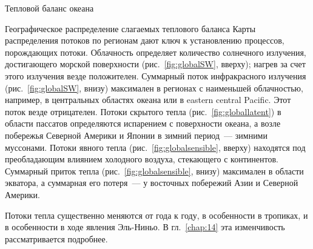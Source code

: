 \begin{chapter}{Тепловой баланс океана}
\begin{section}{Географическое распределение слагаемых теплового баланса}
Карты распределения потоков по регионам дают ключ к установлению процессов,
порождающих потоки. Облачность определяет количество солнечного излучения,
достигающего морской поверхности (рис.~\ref{fig:globalSW}, вверху); 
нагрев за счет этого излучения везде положителен. 
Суммарный поток инфракрасного излучения (рис.~\ref{fig:globalSW}, внизу)
максимален в регионах с наименьшей облачностью, например, в центральных 
областях океана или в eastern central Pacific. Этот поток везде отрицателен.
Потоки скрытого тепла (рис.~\ref{fig:globallatent}) в области пассатов определяются испарением
с поверхности океана, а возле побережья Северной Америки и Японии в зимний
период~--- зимними муссонами. 
Потоки явного тепла (рис.~\ref{fig:globalsensible}, вверху) 
находятся под преобладающим влиянием холодного воздуха, стекающего 
с континентов. 
Суммарный приток тепла (рис.~\ref{fig:globalsensible}, внизу) 
максимален в области экватора, а суммарная его потеря~--- у восточных 
побережий Азии и Северной Америки.
%

Потоки тепла существенно меняются от года к году, в особенности в тропиках,
и в особенности в ходе явления Эль-Ниньо. В гл.~\ref{chap:14} эта
изменчивость рассматривается подробнее.
%
\end{section}


\end{chapter}

